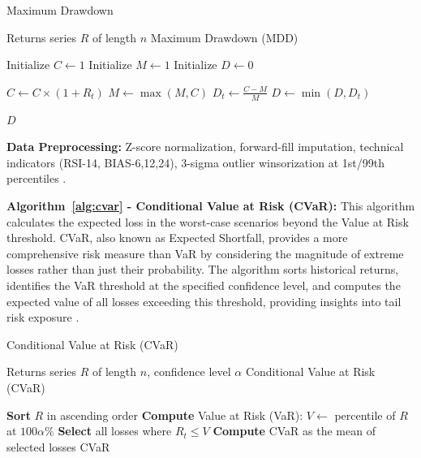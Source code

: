\documentclass[3p,times,procedia]{elsarticle}
\begin{document}
\begin{algorithm}[H]
\caption{Maximum Drawdown}
\label{alg:max_drawdown}
\begin{algorithmic}[1]
    \Require Returns series \( R \) of length \( n \)
    \Ensure Maximum Drawdown (MDD)
    
    \State Initialize \( C \gets 1 \) 
    \State Initialize \( M \gets 1 \) 
    \State Initialize \( D \gets 0 \) 

        \State \( C \gets C \times (1 + R_t) \) 
        \State \( M \gets \max(M, C) \) 
        \State \( D_t \gets \frac{C - M}{M} \) 
        \State \( D \gets \min(D, D_t) \) 
    \EndFor

    \State \Return \( D \)
\end{algorithmic}
\end{algorithm}

\textbf{Data Preprocessing:} Z-score normalization, forward-fill imputation, technical indicators (RSI-14, BIAS-6,12,24), 3-sigma outlier winsorization at 1st/99th percentiles \cite{Fischer2018}.

\textbf{Algorithm~\ref{alg:cvar} - Conditional Value at Risk (CVaR):} This algorithm calculates the expected loss in the worst-case scenarios beyond the Value at Risk threshold. CVaR, also known as Expected Shortfall, provides a more comprehensive risk measure than VaR by considering the magnitude of extreme losses rather than just their probability. The algorithm sorts historical returns, identifies the VaR threshold at the specified confidence level, and computes the expected value of all losses exceeding this threshold, providing insights into tail risk exposure \cite{Rockafellar2000}.

\begin{algorithm}[H]
\caption{Conditional Value at Risk (CVaR)}
\label{alg:cvar}
\begin{algorithmic}[1]
    \Require Returns series $R$ of length $n$, confidence level $\alpha$
    \Ensure Conditional Value at Risk (CVaR)
    
    \State \textbf{Sort} $R$ in ascending order 
    \State \textbf{Compute} Value at Risk (VaR): $V \gets$ percentile of $R$ at $100\alpha$\%
    \State \textbf{Select} all losses where $R_t \leq V$
    \State \textbf{Compute} CVaR as the mean of selected losses
    \State \Return CVaR
\end{algorithmic}
\end{algorithm}
\end{document}
